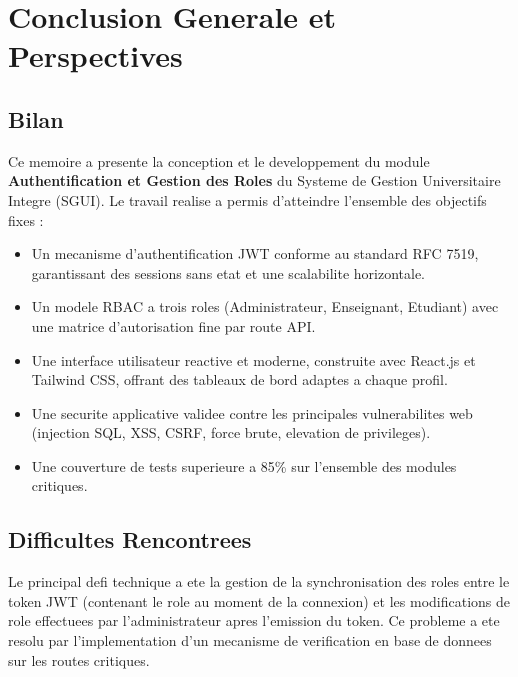 \documentclass[12pt,a4paper]{report}
\begin{document}
\chapter*{Conclusion Generale et Perspectives}

\section*{Bilan}

Ce memoire a presente la conception et le developpement du module
\textbf{Authentification et Gestion des Roles} du Systeme de Gestion
Universitaire Integre (SGUI). Le travail realise a permis d'atteindre
l'ensemble des objectifs fixes :

\begin{itemize}
  \item Un mecanisme d'authentification JWT conforme au standard
        RFC 7519, garantissant des sessions sans etat et une
        scalabilite horizontale.
  \item Un modele RBAC a trois roles (Administrateur, Enseignant,
        Etudiant) avec une matrice d'autorisation fine par route API.
  \item Une interface utilisateur reactive et moderne, construite avec
        React.js et Tailwind CSS, offrant des tableaux de bord adaptes
        a chaque profil.
  \item Une securite applicative validee contre les principales
        vulnerabilites web (injection SQL, XSS, CSRF, force brute,
        elevation de privileges).
  \item Une couverture de tests superieure a 85\% sur l'ensemble des
        modules critiques.
\end{itemize}

\section*{Difficultes Rencontrees}

Le principal defi technique a ete la gestion de la synchronisation des
roles entre le token JWT (contenant le role au moment de la connexion)
et les modifications de role effectuees par l'administrateur apres
l'emission du token. Ce probleme a ete resolu par l'implementation d'un
mecanisme de verification en base de donnees sur les routes critiques.
\end{document}
